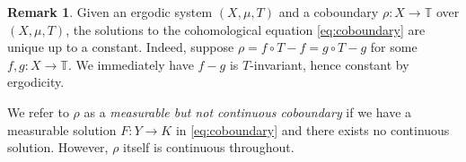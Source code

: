 \documentclass[12pt]{amsart}
\theoremstyle{definition}
\theoremstyle{plain}
\theoremstyle{definition}
\newtheorem{remark}[theorem]{Remark}
\numberwithin{equation}{section}
\begin{document}
\begin{remark} \label{cob soln are unique}
    Given an ergodic system $(X,\mu,T)$ and a coboundary $\rho\colon X \rightarrow \mathbb{T}$ over $(X,\mu,T)$, the solutions to the cohomological equation \eqref{eq:coboundary} are unique up to a constant. Indeed, suppose $\rho=f\circ T - f=g\circ T- g$ for some $f,g\colon  X \rightarrow \mathbb{T}$. We immediately have $f - g$ is $T$-invariant, hence constant by ergodicity.
\end{remark}


We refer to $\rho$ as a \textit{measurable but not continuous coboundary} if we have a measurable solution $F\colon Y \rightarrow K$ in \eqref{eq:coboundary} and there exists no continuous solution. However, $\rho$ itself is continuous throughout.














\end{document}

